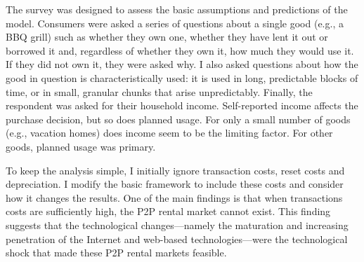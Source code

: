 \documentclass[11pt]{article}
\begin{document}
The survey was designed to assess the basic assumptions and predictions of the model.
Consumers were asked a series of questions about a single good (e.g., a BBQ grill) such as whether they own one, whether they have lent it out or borrowed it and, regardless of whether they own it, how much they would use it. 
If they did not own it, they were asked why. 
I also asked questions about how the good in question is characteristically used: it is used in long, predictable blocks of time, or in small, granular chunks that arise unpredictably. 
Finally, the respondent was asked for their household income.  
Self-reported income affects the purchase decision, but so does planned usage. 
For only a small number of goods (e.g., vacation homes) does income seem to be the limiting factor. 
For other goods, planned usage was primary.  

To keep the analysis simple, I initially ignore transaction costs, reset costs and depreciation. 
I modify the basic framework to include these costs and consider how it changes the results. 
One of the main findings is that when transactions costs are sufficiently high, the P2P rental market cannot exist. 
This finding suggests that the technological changes---namely the maturation and increasing penetration of the Internet and web-based technologies---were the technological shock that made these P2P rental markets feasible. 
\end{document}
